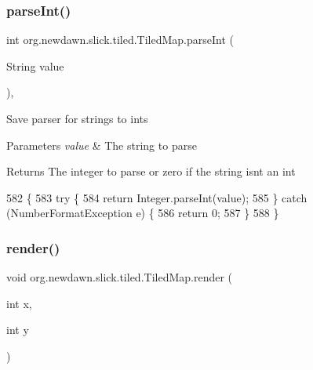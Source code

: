 \subsubsection{\texorpdfstring{parse\+Int()}{parseInt()}}
{\footnotesize\ttfamily int org.\+newdawn.\+slick.\+tiled.\+Tiled\+Map.\+parse\+Int (\begin{DoxyParamCaption}\item[{String}]{value }\end{DoxyParamCaption})\hspace{0.3cm}{\ttfamily [inline]}, {\ttfamily [private]}}

Save parser for strings to ints


\begin{DoxyParams}{Parameters}
{\em value} & The string to parse \\
\hline
\end{DoxyParams}
\begin{DoxyReturn}{Returns}
The integer to parse or zero if the string isn\textquotesingle{}t an int 
\end{DoxyReturn}

\begin{DoxyCode}
582                                        \{
583         \textcolor{keywordflow}{try} \{
584             \textcolor{keywordflow}{return} Integer.parseInt(value);
585         \} \textcolor{keywordflow}{catch} (NumberFormatException e) \{
586             \textcolor{keywordflow}{return} 0;
587         \}
588     \}
\end{DoxyCode}
\mbox{\label{classorg_1_1newdawn_1_1slick_1_1tiled_1_1_tiled_map_a313dd901616b31c772f213675d236389}} 
\subsubsection{\texorpdfstring{render()}{render()}\hspace{0.1cm}{\footnotesize\ttfamily [1/5]}}
{\footnotesize\ttfamily void org.\+newdawn.\+slick.\+tiled.\+Tiled\+Map.\+render (\begin{DoxyParamCaption}\item[{int}]{x,  }\item[{int}]{y }\end{DoxyParamCaption})\hspace{0.3cm}{\ttfamily [inline]}}

